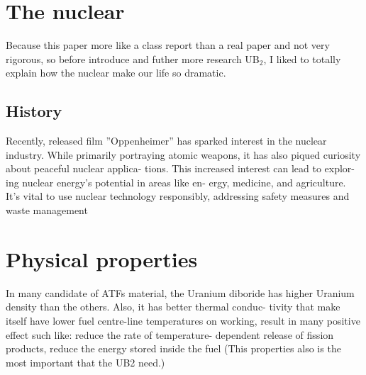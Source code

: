 \documentclass[final,11pt,times,twocolumn]{elsarticle}
\begin{document}
\section{The nuclear}
Because this paper more like a class report than a real paper and not very rigorous, so before
introduce and futher more research UB$_{2}$, I liked to totally
explain how the nuclear make our life so dramatic.

\subsection{History}

Recently, released film ”Oppenheimer” has
sparked interest in the nuclear industry. While
primarily portraying atomic weapons, it has also
piqued curiosity about peaceful nuclear applica-
tions. This increased interest can lead to explor-
ing nuclear energy’s potential in areas like en-
ergy, medicine, and agriculture. It’s vital to use
nuclear technology responsibly, addressing safety
measures and waste management

\section{Physical properties}
In many candidate of ATFs material, the Uranium 
diboride has higher Uranium density than
the others. Also, it has better thermal conduc-
tivity that make itself have lower fuel centre-line
temperatures on working, result in many positive
effect such like: reduce the rate of temperature-
dependent release of fission products, reduce the
energy stored inside the fuel (This properties also
is the most important that the UB2 need.)
\end{document}
